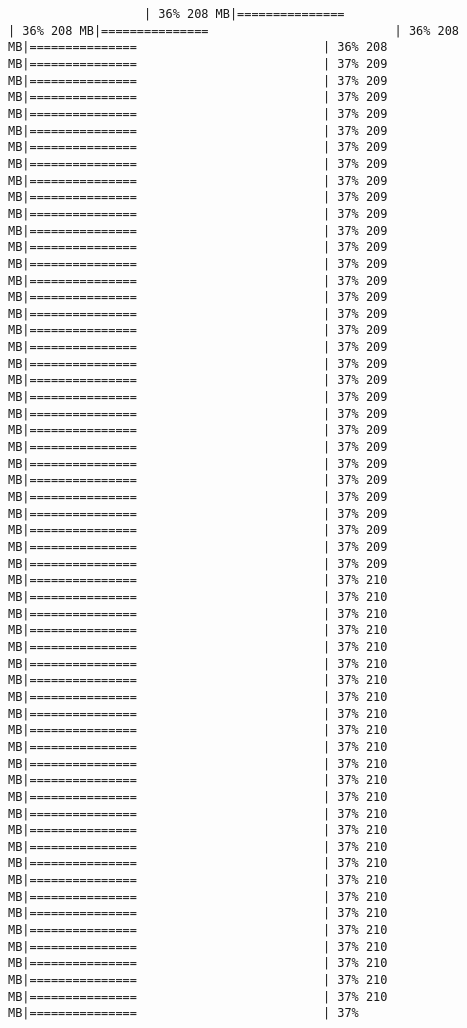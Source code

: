 \documentclass[
]{article}
\begin{document}
\begin{verbatim}
                   | 36% 208 MB|===============                          | 36% 208 MB|===============                          | 36% 208 MB|===============                          | 36% 208 MB|===============                          | 37% 209 MB|===============                          | 37% 209 MB|===============                          | 37% 209 MB|===============                          | 37% 209 MB|===============                          | 37% 209 MB|===============                          | 37% 209 MB|===============                          | 37% 209 MB|===============                          | 37% 209 MB|===============                          | 37% 209 MB|===============                          | 37% 209 MB|===============                          | 37% 209 MB|===============                          | 37% 209 MB|===============                          | 37% 209 MB|===============                          | 37% 209 MB|===============                          | 37% 209 MB|===============                          | 37% 209 MB|===============                          | 37% 209 MB|===============                          | 37% 209 MB|===============                          | 37% 209 MB|===============                          | 37% 209 MB|===============                          | 37% 209 MB|===============                          | 37% 209 MB|===============                          | 37% 209 MB|===============                          | 37% 209 MB|===============                          | 37% 209 MB|===============                          | 37% 209 MB|===============                          | 37% 209 MB|===============                          | 37% 209 MB|===============                          | 37% 209 MB|===============                          | 37% 209 MB|===============                          | 37% 209 MB|===============                          | 37% 210 MB|===============                          | 37% 210 MB|===============                          | 37% 210 MB|===============                          | 37% 210 MB|===============                          | 37% 210 MB|===============                          | 37% 210 MB|===============                          | 37% 210 MB|===============                          | 37% 210 MB|===============                          | 37% 210 MB|===============                          | 37% 210 MB|===============                          | 37% 210 MB|===============                          | 37% 210 MB|===============                          | 37% 210 MB|===============                          | 37% 210 MB|===============                          | 37% 210 MB|===============                          | 37% 210 MB|===============                          | 37% 210 MB|===============                          | 37% 210 MB|===============                          | 37% 210 MB|===============                          | 37% 210 MB|===============                          | 37% 210 MB|===============                          | 37% 210 MB|===============                          | 37% 210 MB|===============                          | 37% 210 MB|===============                          | 37% 210 MB|===============                          | 37% 210 MB|===============                          | 37% 
\end{verbatim}
\end{document}
